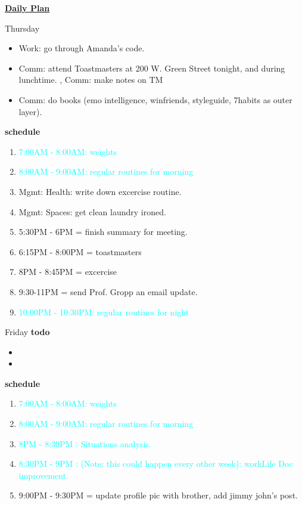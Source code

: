 \documentclass[serif,mathserif,final]{beamer}
\newcommand{\regItem}[1]{\item \textcolor{cyan}{#1}}
\begin{document}
\begin{frame}{}
\begin{columns}[t]
\begin{column}{0.27\linewidth}{\textbf{\underline{Daily Plan}}}
{\begin{block}{\small Thursday}
\begin{itemize}
\item \tiny Work: go through Amanda's code. 

\item \tiny Comm: attend Toastmasters at 200 W. Green Street tonight, and during lunchtime. , Comm: make notes on TM 

\item \tiny Comm: do books (emo intelligence, winfriends, styleguide, 7habits as outer layer). 

\end{itemize} 

\textbf{schedule} \\
  \begin{enumerate} 
    \regItem{7:00AM - 8:00AM: weights}
    \regItem{8:00AM - 9:00AM: regular routines for morning}
  \item \tiny Mgmt: Health: write down excercise routine.  
  \item \tiny Mgmt: Spaces: get clean laundry ironed.     
  \item \tiny 5:30PM - 6PM = finish summary for meeting.  
  \item \tiny 6:15PM - 8:00PM = toastmasters 
  \item \tiny 8PM - 8:45PM = excercise 
    
  \item \tiny 9:30-11PM = send Prof. Gropp an email update. 
    \regItem{10:00PM - 10:30PM: regular routines for night}
  \end{enumerate}
\end{block}

\begin{block}{\small Friday} 
  \textbf{todo} 
  \begin{itemize} 
  \item \tiny 
  \item \tiny
  \end{itemize} 

  \textbf{schedule}
\begin{enumerate} 
  
  \regItem{\tiny 7:00AM - 8:00AM: weights}
  \regItem{\tiny 8:00AM - 9:00AM: regular routines for morning}
  
  \regItem{\tiny 8PM - 8:30PM : Situations analysis.} 
  \regItem{\tiny 8:30PM - 9PM : (Note: this could happen every other week):  workLife Doc improvement. } 
  \tiny \item \tiny 9:00PM - 9:30PM  =  update profile pic with brother, add jimmy john's post.
  

\end{enumerate}
\end{block}}
\end{column}
\end{columns}
\end{frame}
\end{document}
